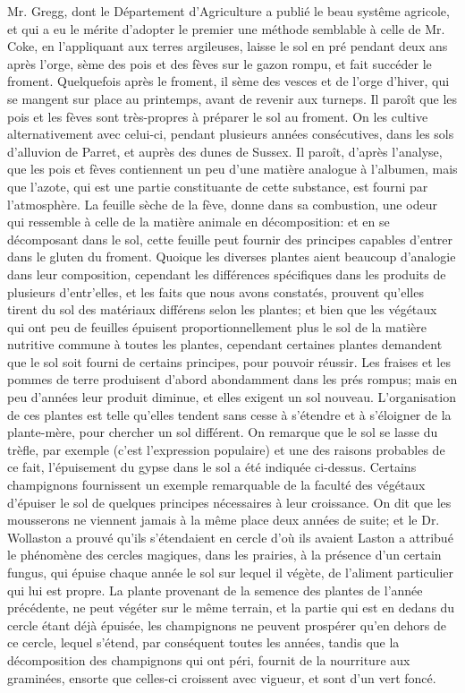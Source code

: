 \setcounter{page}{284} Mr. Gregg, dont le Département d'Agriculture a publié le beau systême agricole, et qui a eu le mérite d'adopter le premier une méthode semblable à celle de Mr. Coke, en l'appliquant aux terres argileuses, laisse le sol en pré pendant deux ans après l'orge, sème des pois et des fèves sur le gazon rompu, et fait succéder le froment. Quelquefois après le froment, il sème des vesces et de l'orge d'hiver, qui se mangent sur place au printemps, avant de revenir aux turneps. Il paroît que les pois et les fèves sont très-propres à préparer le sol au froment. On les cultive alternativement avec celui-ci, pendant plusieurs années consécutives, dans les sols d'alluvion de Parret, et auprès des dunes de Sussex. Il paroît, d'après l'analyse, que les pois et fèves contiennent un peu d'une matière analogue à l'albumen, mais que l'azote, qui est une partie constituante de cette substance, est fourni par l'atmosphère. La feuille sèche de la fève, donne dans sa combustion, une odeur qui ressemble à celle de la matière animale en décomposition: et en se décomposant dans le sol, cette feuille peut fournir des principes capables d'entrer dans le gluten du froment. Quoique les diverses plantes aient beaucoup d'analogie dans leur composition, cependant\setcounter{page}{285} les différences spécifiques dans les produits de plusieurs d'entr'elles, et les faits que nous avons constatés, prouvent qu'elles tirent du sol des matériaux différens selon les plantes; et bien que les végétaux qui ont peu de feuilles épuisent proportionnellement plus le sol de la matière nutritive commune à toutes les plantes, cependant certaines plantes demandent que le sol soit fourni de certains principes, pour pouvoir réussir. Les fraises et les pommes de terre produisent d'abord abondamment dans les prés rompus; mais en peu d'années leur produit diminue, et elles exigent un sol nouveau. L'organisation de ces plantes est telle qu'elles tendent sans cesse à s'étendre et à s'éloigner de la plante-mère, pour chercher un sol différent. On remarque que le sol se lasse du trèfle, par exemple (c'est l'expression populaire) et une des raisons probables de ce fait, l'épuisement du gypse dans le sol a été indiquée ci-dessus.
Certains champignons fournissent un exemple remarquable de la faculté des végétaux d'épuiser le sol de quelques principes nécessaires à leur croissance. On dit que les mousserons ne viennent jamais à la même place deux années de suite; et le Dr. Wollaston a prouvé qu'ils s'étendaient en cercle d'où ils avaient\setcounter{page}{286} Laston a attribué le phénomène des cercles magiques, dans les prairies, à la présence d'un certain fungus, qui épuise chaque année le sol sur lequel il végète, de l'aliment particulier qui lui est propre. La plante provenant de la semence des plantes de l'année précédente, ne peut végéter sur le même terrain, et la partie qui est en dedans du cercle étant déjà épuisée, les champignons ne peuvent prospérer qu'en dehors de ce cercle, lequel s'étend, par conséquent toutes les années, tandis que la décomposition des champignons qui ont péri, fournit de la nourriture aux graminées, ensorte que celles-ci croissent avec vigueur, et sont d'un vert foncé.
